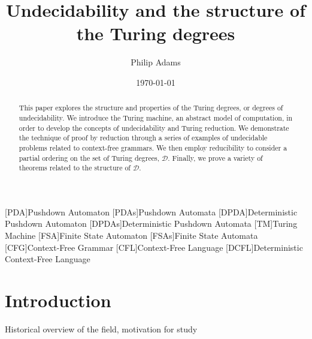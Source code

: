 \documentclass[psamsfonts]{amsart}
\title{Undecidability and the structure of the Turing degrees}
\author{Philip Adams}
\date{\today}
\theoremstyle{definition}
\theoremstyle{remark}
\numberwithin{equation}{section}
\begin{document}
\begin{abstract}

  This paper explores the structure and properties of the Turing degrees, or
  degrees of undecidability. We introduce the Turing machine, an abstract model
  of computation, in order to develop the concepts of undecidability and Turing
  reduction. We demonstrate the technique of proof by reduction through a series
  of examples of undecidable problems related to context-free grammars. We then
  employ reducibility to consider a partial ordering on the set of Turing degrees, $\mathcal{D}$. Finally, we prove a variety of theorems
  related to the structure of $\mathcal{D}$.
  
\end{abstract}

\maketitle


\tableofcontents
\begin{acronym}
  [PDA]{Pushdown Automaton}
  [PDAs]{Pushdown Automata}
  [DPDA]{Deterministic Pushdown Automaton}
  [DPDAs]{Deterministic Pushdown Automata}
  [TM]{Turing Machine}
  [FSA]{Finite State Automaton}
  [FSAs]{Finite State Automata}
  [CFG]{Context-Free Grammar}
  [CFL]{Context-Free Language}
  [DCFL]{Deterministic Context-Free Language}
\end{acronym}

\section{Introduction}
Historical overview of the field, motivation for study
\cite{ambos-spies06:_degrees_unsol}
\cite{soare16_turin_comput}
\cite{soare1999history}
\cite{lerman16:_degrees_unsol}
\todo{}
\end{document}

